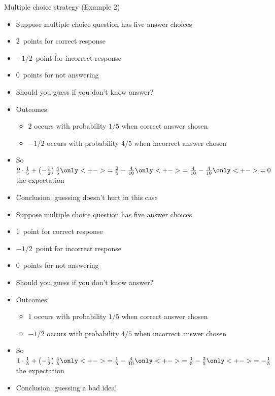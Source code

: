 \documentclass[handout]{beamer}
\theoremstyle{definition}
\begin{document}
\begin{frame}{Multiple choice strategy (Example 2)}
\begin{itemize}
\item Suppose multiple choice question has five answer choices
\item $2$~points for correct response
\item $-1/2$~point for incorrect response
\item $0$~points for not answering
\item Should you guess if you don't know answer?
\item Outcomes:
\begin{itemize}
\item $2$ occurs with probability $1/5$ when correct answer chosen
\item $-1/2$ occurs with probability $4/5$ when incorrect answer chosen
\end{itemize}
\item So $2\cdot\frac{1}{5}+\left(-\frac{1}{2}\right)\frac{4}{5}
\only<+->{=\frac{2}{5}-\frac{4}{10}}
\only<+->{=\frac{4}{10}-\frac{4}{10}}
\only<+->{=0}$ the expectation
\item Conclusion: guessing doesn't hurt \alert{in this case}
\end{itemize}
\end{frame}

\begin{frame}
\begin{itemize}
\item Suppose multiple choice question has five answer choices
\item \alert{$1$~point} for correct response
\item $-1/2$~point for incorrect response
\item $0$~points for not answering
\item Should you guess if you don't know answer?
\item Outcomes:
\begin{itemize}
\item $1$ occurs with probability $1/5$ when correct answer chosen
\item $-1/2$ occurs with probability $4/5$ when incorrect answer chosen
\end{itemize}
\item So $1\cdot\frac{1}{5}+\left(-\frac{1}{2}\right)\frac{4}{5}
\only<+->{=\frac{1}{5}-\frac{4}{10}}
\only<+->{=\frac{1}{5}-\frac{2}{5}}
\only<+->{=-\frac{1}{5}}$ the expectation
\item Conclusion: guessing a bad idea!
\end{itemize}
\end{frame}
\end{document}
